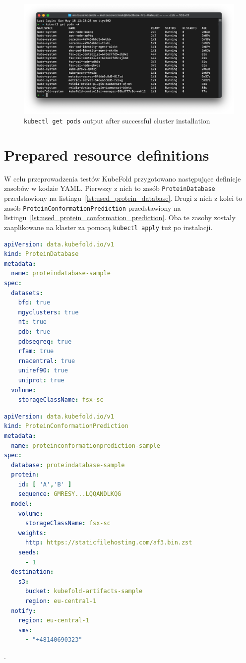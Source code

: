 \begin{figure}[htbp]
  \centering
  \includegraphics[width=\textwidth]{images/eks_pods_terminal}
  \caption{\texttt{kubectl get pods} output after successful cluster installation}
  \label{fig:eks_pods_terminal}
\end{figure}


\section{Prepared resource definitions}

W celu przeprowadzenia testów KubeFold przygotowano następujące definicje zasobów w kodzie YAML.
Pierwszy z nich to zasób \texttt{ProteinDatabase} przedstawiony na listingu~\ref{lst:used_protein_database}.
Drugi z nich z kolei to zasób \texttt{ProteinConformationPrediction} przedstawiony na listingu~\ref{lst:used_protein_conformation_prediction}.
Oba te zasoby zostały zaaplikowane na klaster za pomocą \texttt{kubectl apply} tuż po instalacji.

\begin{lstlisting}[language=yaml,caption={Used \texttt{ProteinDatabase} resource definition},label={lst:used_protein_database}]
apiVersion: data.kubefold.io/v1
kind: ProteinDatabase
metadata:
  name: proteindatabase-sample
spec:
  datasets:
    bfd: true
    mgyclusters: true
    nt: true
    pdb: true
    pdbseqreq: true
    rfam: true
    rnacentral: true
    uniref90: true
    uniprot: true
  volume:
    storageClassName: fsx-sc
\end{lstlisting}

\begin{lstlisting}[language=yaml,caption={Used \texttt{ProteinConformationPrediction} resource definition},label={lst:used_protein_conformation_prediction}]
apiVersion: data.kubefold.io/v1
kind: ProteinConformationPrediction
metadata:
  name: proteinconformationprediction-sample
spec:
  database: proteindatabase-sample
  protein:
    id: [ 'A','B' ]
    sequence: GMRESY...LQQANDLKQG
  model:
    volume:
      storageClassName: fsx-sc
    weights:
      http: https://staticfilehosting.com/af3.bin.zst
    seeds:
      - 1
  destination:
    s3:
      bucket: kubefold-artifacts-sample
      region: eu-central-1
  notify:
    region: eu-central-1
    sms:
      - "+48140690323"
\end{lstlisting}.

